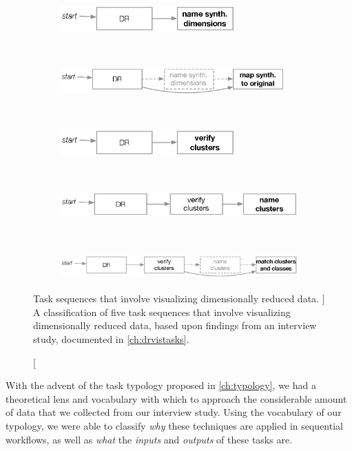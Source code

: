 \begin{figure}
	\centering
	\begin{subfigure}[t]{\textwidth}
	    \centering
        \includegraphics[height=1cm]{figures/drviztasks-name-dims.eps}
    \end{subfigure}
    ~
    \begin{subfigure}[t]{\textwidth}
	    \centering
        \includegraphics[height=1cm]{figures/drviztasks-map-dims.eps}
    \end{subfigure}
    ~
    \begin{subfigure}[t]{\textwidth}
	    \centering
        \includegraphics[height=1cm]{figures/drviztasks-identify-clusters.eps}
    \end{subfigure}
    ~
    \begin{subfigure}[t]{\textwidth}
	    \centering
        \includegraphics[height=1cm]{figures/drviztasks-name-clusters.eps}
    \end{subfigure}
    ~
    \begin{subfigure}[t]{\textwidth}
	    \centering
        \includegraphics[height=1cm]{figures/drviztasks-match-clusters.eps}
    \end{subfigure}
	\caption
	[
	    Task sequences that involve visualizing dimensionally reduced data.
	]{
    	A classification of five task sequences that involve visualizing dimensionally reduced data, based upon findings from an interview study, documented in \autoref{ch:drvistasks}.
	}
	\centering
	\label{fig:dritw}
\end{figure}


With the advent of the task typology proposed in \autoref{ch:typology}, we had a theoretical lens and vocabulary with which to approach the considerable amount of data that we collected from our interview study. 
Using the vocabulary of our typology, %
we were able to classify {\it why} these techniques are applied in sequential workflows, as well as {\it what} the {\it inputs} and {\it outputs} of these tasks are.

